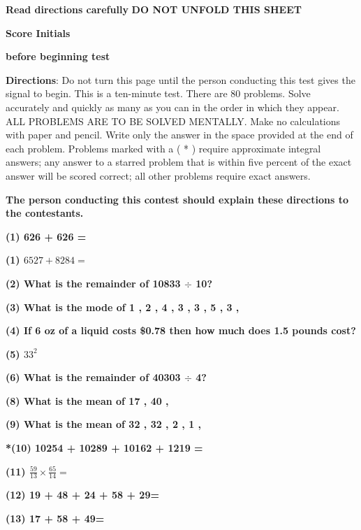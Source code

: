 \documentclass{article}
\begin{document}
\noindent \textbf{Read directions carefully} \hspace{.45in} {\textbf{DO NOT UNFOLD THIS SHEET} }\hfill{\textbf{Score\hspace {.05in} Initials}

\noindent \textbf{before beginning test} \hfill{}


\textbf{Directions}:  Do not turn this page until the person conducting this test gives the signal to begin. This is a ten-minute test. There are 80 problems. Solve accurately and quickly as many as you can in the order in which they appear. ALL  PROBLEMS  ARE  TO  BE SOLVED MENTALLY.  Make  no  calculations with paper and  pencil.  Write only the answer  in the space provided at the end of each problem.  Problems marked with a  ( * )  require approximate integral answers;  any answer to a starred problem  that is within five percent of the exact answer will be scored correct; all other problems require exact answers.


\textbf{The person conducting this contest should explain these directions to the contestants.}



\begin{multicols}{2}
\begin{flushleft}\textbf{(1) 626 + 626 = \hrulefill}

\textbf{(1) $6527+8284 = $\hrulefill}

\textbf{(2) What is the remainder of 10833 $\div$ 10?\hrulefill}

\textbf{(3) What is the mode of 1 , 2 , 4 , 3 , 3 , 5 , 3 , \hrulefill}

\textbf{(4) If 6 oz of a liquid costs \$0.78 then how much does 1.5 pounds cost?\hrulefill}

\textbf{(5) $33^{2}$\hrulefill}

\textbf{(6) What is the remainder of 40303 $\div$ 4?\hrulefill}

\textbf{(8) What is the mean of 17 , 40 , \hrulefill}

\textbf{(9) What is the mean of 32 , 32 , 2 , 1 , \hrulefill}

\textbf{*(10) 10254 + 10289 + 10162 + 1219 =\hrulefill}

\textbf{(11) $\frac{59}{13}\times\frac{65}{14}=$\hrulefill}

\textbf{(12) 19 + 48 + 24 + 58 + 29=\hrulefill}

\textbf{(13) 17 + 58 + 49=\hrulefill}


\end{flushleft}
\end{multicols}}
\end{document}
